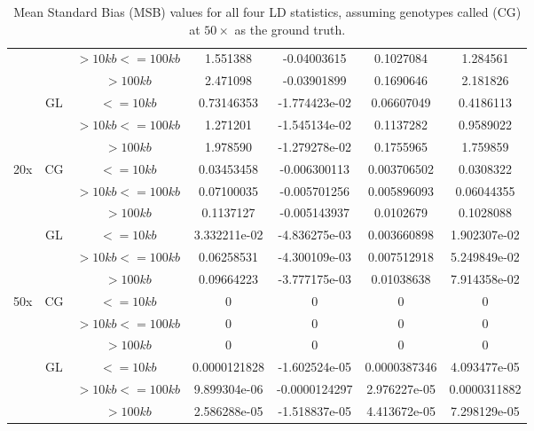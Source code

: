 \documentclass[a4paper]{article}
\begin{document}
\begin{table}[H]
\begin{tabular}{c|c|c|c|c|c|c}
& & $>10kb <=100kb$ & 1.551388 & -0.04003615 & 0.1027084 & 1.284561 \\
& & $>100kb$ & 2.471098 & -0.03901899 & 0.1690646 & 2.181826 \\
\cline{2-7}
& \multirow{3}{*}{GL} & $<=10kb$ & 0.73146353 & -1.774423e-02 & 0.06607049 & 0.4186113 \\
& & $>10kb <=100kb$ & 1.271201 & -1.545134e-02 & 0.1137282 & 0.9589022 \\
& & $>100kb$ & 1.978590 & -1.279278e-02 & 0.1755965 & 1.759859 \\
\hline
\multirow{6}{*}{20x} & \multirow{3}{*}{CG} & $<=10kb$ & 0.03453458 & -0.006300113 & 0.003706502 & 0.0308322 \\
& & $>10kb <=100kb$ & 0.07100035 & -0.005701256 & 0.005896093 & 0.06044355 \\
& & $>100kb$ & 0.1137127 & -0.005143937 & 0.0102679 & 0.1028088 \\
\cline{2-7}
& \multirow{3}{*}{GL} & $<=10kb$ & 3.332211e-02 & -4.836275e-03 & 0.003660898 & 1.902307e-02 \\
& & $>10kb <=100kb$ & 0.06258531 & -4.300109e-03 & 0.007512918 & 5.249849e-02 \\
& & $>100kb$ & 0.09664223 & -3.777175e-03 & 0.01038638 & 7.914358e-02 \\
\hline
\multirow{6}{*}{50x} & \multirow{3}{*}{CG} & $<=10kb$ & 0 & 0 & 0 & 0 \\
& & $>10kb <=100kb$ & 0 & 0 & 0 & 0 \\
& & $>100kb$ & 0 & 0 & 0 & 0 \\
\cline{2-7}
& \multirow{3}{*}{GL} & $<=10kb$ & 0.0000121828 & -1.602524e-05 & 0.0000387346 & 4.093477e-05 \\
& & $>10kb <=100kb$ & 9.899304e-06 & -0.0000124297 & 2.976227e-05 & 0.0000311882 \\
& & $>100kb$ & 2.586288e-05 & -1.518837e-05 & 4.413672e-05 & 7.298129e-05 \\
\hline
\end{tabular}
\caption{Mean Standard Bias (MSB) values for all four LD statistics, assuming genotypes called (CG) at $50\times$ as the ground truth.}\label{STab:MSB}
\end{table}
\end{document}
